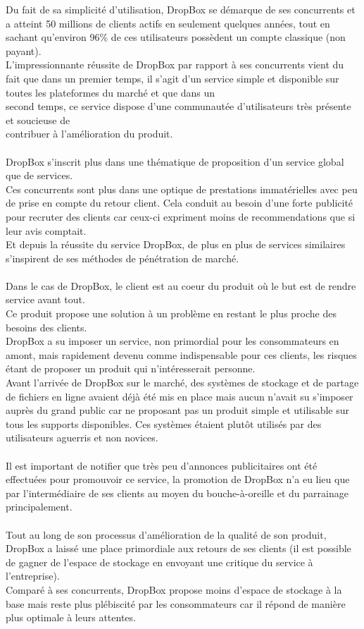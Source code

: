 \documentclass[a4paper, 10pt]{article}
\begin{document}
Du fait de sa simplicité d'utilisation, DropBox se démarque de ses concurrents et
a atteint 50 millions de clients actifs en seulement quelques années,
tout en sachant qu'environ 96\% de ces utilisateurs possèdent un compte classique (non payant).\\
L'impressionnante réussite de DropBox par rapport à ses concurrents vient du fait que dans un premier temps,
il s'agit d'un service simple et disponible sur toutes les plateformes du marché et
que dans un\\second temps, ce service dispose d'une communautée d'utilisateurs très présente et soucieuse
de\\contribuer à l'amélioration du produit.\\ \\
DropBox s'inscrit plus dans une thématique de proposition d'un service global que de services.\\
Ces concurrents sont plus dans une optique de prestations immatérielles avec peu de prise en compte du retour client.
Cela conduit au besoin d'une forte publicité pour recruter des clients
car ceux-ci expriment moins de recommendations que si leur avis comptait.\\
Et depuis la réussite du service DropBox, de plus en plus de services similaires s'inspirent de ses méthodes de pénétration de marché.\\ \\
Dans le cas de DropBox, le client est au coeur du produit où le but est de rendre service avant tout.\\
Ce produit propose une solution à un problème en restant le plus proche des besoins des clients.\\
DropBox a su imposer un service, non primordial pour les consommateurs en amont,
mais rapidement devenu comme indispensable pour ces clients, les risques étant de proposer un produit qui n'intéresserait personne.\\
Avant l'arrivée de DropBox sur le marché, des systèmes de stockage et de partage de fichiers en ligne avaient déjà été mis en place
mais aucun n'avait su s'imposer auprès du grand public car ne proposant pas un produit simple et utilisable sur tous les supports disponibles.
Ces systèmes étaient plutôt utilisés par des utilisateurs aguerris et non novices.\\ \\
Il est important de notifier que très peu d'annonces publicitaires ont été effectuées pour promouvoir ce service,
la promotion de DropBox n'a eu lieu que par l'intermédiaire de ses clients au moyen du bouche-à-oreille et du parrainage principalement.\\ \\
Tout au long de son processus d'amélioration de la qualité de son produit, DropBox a laissé une place primordiale aux retours de ses clients
(il est possible de gagner de l'espace de stockage en envoyant une critique du service à l'entreprise).\\
Comparé à ses concurrents, DropBox propose moins d'espace de stockage à la base mais reste plus plébiscité par les consommateurs
car il répond de manière plus optimale à leurs attentes.\\ \\
\end{document}
